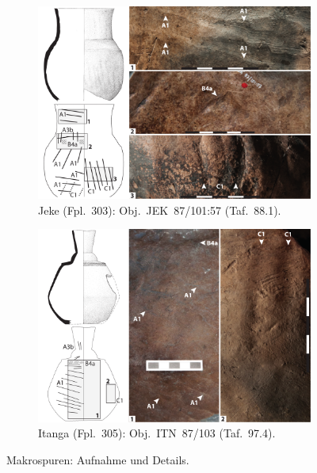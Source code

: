 \begin{multicols}{2}
\begin{figure}[p]
	\centering
	\begin{subfigure}{\textwidth}
		\centering
		\includegraphics[width = \textwidth]{fig/Abb_Macrotraces/JEK87-101-57.pdf}
		\caption{Jeke (Fpl.~303): Obj.~JEK~87/101:57 (Taf.~88.1).\vspace{1em}}
		\label{JEK87-103-57_Makrospuren}
	\end{subfigure}
	\begin{subfigure}{\textwidth}
		\centering
		\includegraphics[width = \textwidth]{fig/Abb_Macrotraces/ITN87-103.pdf}
		\caption{Itanga (Fpl.~305): Obj.~ITN~87/103 (Taf.~97.4).}
		\label{ITN87-103_Makrospuren}
	\end{subfigure}
	\caption{Makrospuren: Aufnahme und Details.}
\end{figure}


\end{multicols}
